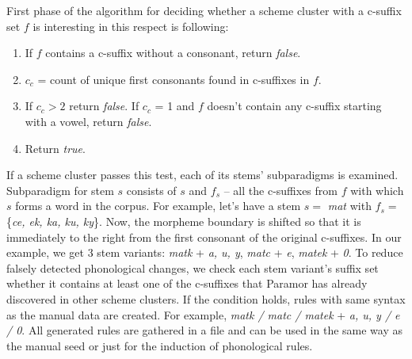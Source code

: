 \documentclass{itatnew}
\begin{document}
First phase of the algorithm for deciding whether a scheme cluster with a c-suffix set $f$ is interesting in this respect is following:
\begin{enumerate}
\item If $f$ contains a c-suffix without a consonant, return \emph{false}.
\item $c_c$ = count of unique first consonants found in c-suffixes in $f$.
\item If $c_c > 2$ return \emph{false}. If $c_c$ = 1 and $f$ doesn't contain any c-suffix starting with a vowel, return \emph{false}.
\item Return \emph{true}.
\end{enumerate}
If a scheme cluster passes this test, each of its stems' subparadigms is examined. Subparadigm for stem $s$ consists of $s$ and $f_s$ -- all the c-suffixes from $f$ with which $s$ forms a word in the corpus. For example, let's have a stem $s = $ \emph{mat} with $f_s = $ \{\emph{ce, ek, ka, ku, ky}\}. Now, the morpheme boundary is shifted so that it is immediately to the right from the first consonant of the original c-suffixes. In our example, we get 3 stem variants: \emph{matk} + \emph{a, u, y}, \emph{matc} + \emph{e}, \emph{matek} + \emph{0}. To reduce falsely detected phonological changes, we check each stem variant's suffix set whether it contains at least one of the c-suffixes that Paramor has already discovered in other scheme clusters. If the condition holds, rules with same syntax as the manual data are created. For example, \emph{matk / matc / matek} + \emph{a, u, y / e / 0}. All generated rules are gathered in a file and can be used in the same way as the manual seed or just for the induction of phonological rules.
\end{document}

